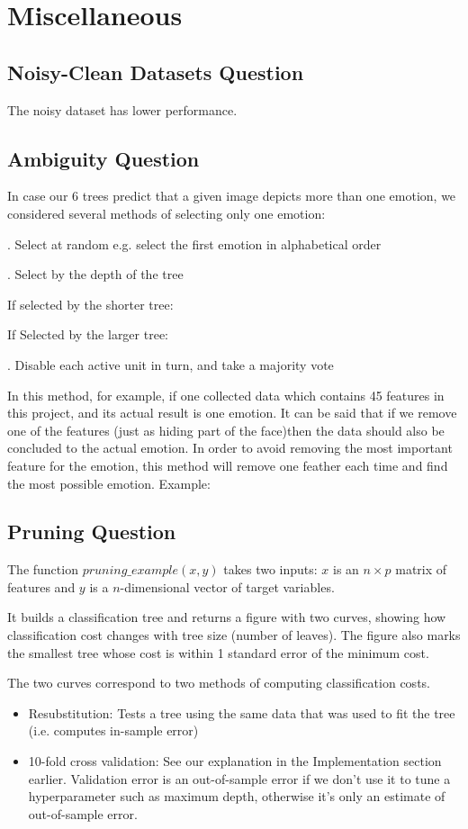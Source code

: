 \documentclass[12pt, a4paper]{article}
\begin{document}
\section*{Miscellaneous}

\subsection*{Noisy-Clean Datasets Question}

The noisy dataset has lower performance.\par

\subsection*{Ambiguity Question}
In case our 6 trees predict that a given image depicts more than one emotion, we considered several methods of selecting only one emotion:\par
{}. Select at random e.g. select the first emotion in alphabetical order\par
{}. Select by the depth of the tree\par
If selected by the shorter tree:\par
If Selected by the larger tree:\par
{}. Disable each active unit in turn, and take a majority vote\par
In this method, for example, if one collected data which contains 45 features in this project, and its actual result is one emotion. It can be said that if we remove one of the features (just as hiding part of the face)then the data should also be concluded to the actual emotion. In order to avoid removing the most important feature for the emotion, this method will remove one feather each time and find the most possible emotion.
Example:\par
\bigskip

\subsection*{Pruning Question}
The function $pruning\_example(x, y)$ takes two inputs: $x$ is an $n \times p$ matrix of features and $y$ is a $n$-dimensional vector of target variables.\par
\bigskip
It builds a classification tree and returns a figure with two curves, showing how classification cost changes with tree size (number of leaves). The figure also marks the smallest tree whose cost is within 1 standard error of the minimum cost.\par
\bigskip
The two curves correspond to two methods of computing classification costs.
\begin{itemize}
    \item Resubstitution: Tests a tree using the same data that was used to fit the tree (i.e. computes in-sample error)
    \item 10-fold cross validation: See our explanation in the Implementation section earlier. Validation error is an out-of-sample error if we don't use it to tune a hyperparameter such as maximum depth, otherwise it's only an estimate of out-of-sample error.
\end{itemize}
\end{document}
